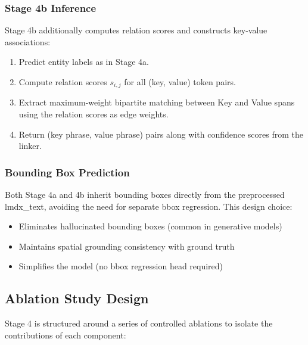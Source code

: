 \subsubsection{Stage 4b Inference}

Stage 4b additionally computes relation scores and constructs key-value associations:

\begin{enumerate}
    \item Predict entity labels as in Stage 4a.
    \item Compute relation scores $s_{i,j}$ for all (key, value) token pairs.
    \item Extract maximum-weight bipartite matching between Key and Value spans using the relation scores as edge weights.
    \item Return (key phrase, value phrase) pairs along with confidence scores from the linker.
\end{enumerate}

\subsubsection{Bounding Box Prediction}

Both Stage 4a and 4b inherit bounding boxes directly from the preprocessed lmdx\_text, avoiding the need for separate bbox regression. This design choice:

\begin{itemize}
    \item Eliminates hallucinated bounding boxes (common in generative models)
    \item Maintains spatial grounding consistency with ground truth
    \item Simplifies the model (no bbox regression head required)
\end{itemize}

\subsection{Ablation Study Design}
\label{sec:stage4_ablation}

Stage 4 is structured around a series of controlled ablations to isolate the contributions of each component:

